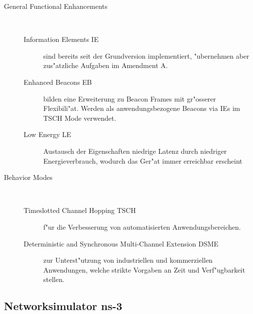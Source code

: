 \begin{description}

\item[General Functional Enhancements] \hfill \\
  \begin{description}
    \item[Information Elements IE] sind bereits seit der Grundversion implementiert,
    "ubernehmen aber zus"atzliche Aufgaben im Amendment A.
    \item[Enhanced Beacons EB] bilden eine Erweiterung zu Beacon Frames mit gr"osserer
    Flexibili"at. Werden als anwendungsbezogene Beacons via IEs im TSCH Mode verwendet.

    \item[Low Energy LE] Austausch der Eigenschaften niedrige Latenz durch
    niedriger Energieverbrauch, wodurch das Ger"at immer erreichbar erscheint
  \end{description}

  \item[Behavior Modes] \hfill \\

    \begin{description}
      \item[Timeslotted Channel Hopping TSCH] f"ur die Verbesserung von automatisierten
      Anwendungsbereichen.
      \item[Deterministic and Synchronous Multi-Channel Extension DSME] zur Unterst"utzung
      von industriellen und kommerziellen Anwendungen, welche strikte Vorgaben
      an Zeit und Verf"ugbarkeit stellen.
    \end{description}
\end{description}


\subsection{Networksimulator ns-3} \label{Kap5-5}

